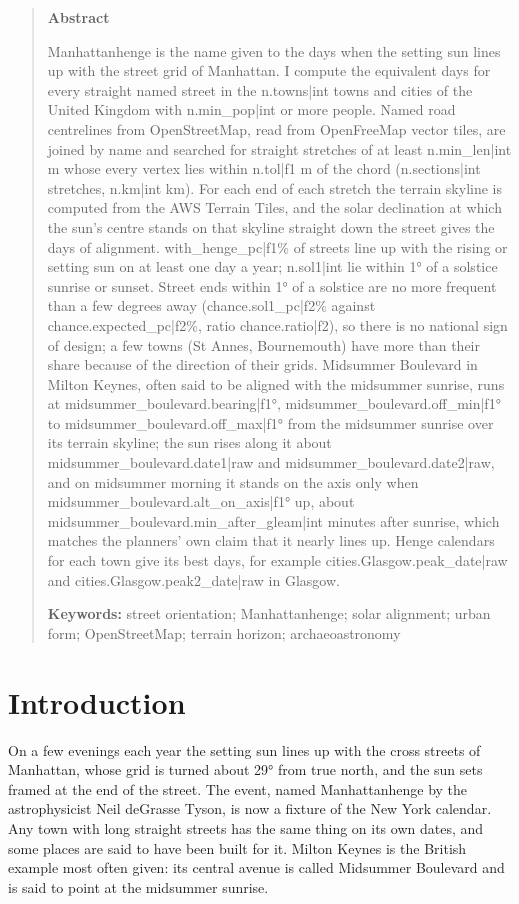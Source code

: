 \documentclass[11pt,a4paper]{article}
\begin{document}
\begin{quote}
\small
\begin{center}\textbf{Abstract}\end{center}
Manhattanhenge is the name given to the days when the setting sun lines up with the street grid of Manhattan. I compute the equivalent days for every straight named street in the {{n.towns|int}} towns and cities of the United Kingdom with {{n.min_pop|int}} or more people. Named road centrelines from OpenStreetMap, read from OpenFreeMap vector tiles, are joined by name and searched for straight stretches of at least {{n.min_len|int}} m whose every vertex lies within {{n.tol|f1}} m of the chord ({{n.sections|int}} stretches, {{n.km|int}} km). For each end of each stretch the terrain skyline is computed from the AWS Terrain Tiles, and the solar declination at which the sun's centre stands on that skyline straight down the street gives the days of alignment. {{with_henge_pc|f1}}\% of streets line up with the rising or setting sun on at least one day a year; {{n.sol1|int}} lie within 1° of a solstice sunrise or sunset. Street ends within 1° of a solstice are no more frequent than a few degrees away ({{chance.sol1_pc|f2}}\% against {{chance.expected_pc|f2}}\%, ratio {{chance.ratio|f2}}), so there is no national sign of design; a few towns (St Annes, Bournemouth) have more than their share because of the direction of their grids. Midsummer Boulevard in Milton Keynes, often said to be aligned with the midsummer sunrise, runs at {{midsummer_boulevard.bearing|f1}}°, {{midsummer_boulevard.off_min|f1}}° to {{midsummer_boulevard.off_max|f1}}° from the midsummer sunrise over its terrain skyline; the sun rises along it about {{midsummer_boulevard.date1|raw}} and {{midsummer_boulevard.date2|raw}}, and on midsummer morning it stands on the axis only when {{midsummer_boulevard.alt_on_axis|f1}}° up, about {{midsummer_boulevard.min_after_gleam|int}} minutes after sunrise, which matches the planners' own claim that it nearly lines up. Henge calendars for each town give its best days, for example {{cities.Glasgow.peak_date|raw}} and {{cities.Glasgow.peak2_date|raw}} in Glasgow.

\textbf{Keywords:} street orientation; Manhattanhenge; solar alignment; urban form; OpenStreetMap; terrain horizon; archaeoastronomy
\end{quote}

\section{Introduction}
On a few evenings each year the setting sun lines up with the cross streets of Manhattan, whose grid is turned about 29° from true north, and the sun sets framed at the end of the street. The event, named Manhattanhenge by the astrophysicist Neil deGrasse Tyson, is now a fixture of the New York calendar. Any town with long straight streets has the same thing on its own dates, and some places are said to have been built for it. Milton Keynes is the British example most often given: its central avenue is called Midsummer Boulevard and is said to point at the midsummer sunrise.
\end{document}
